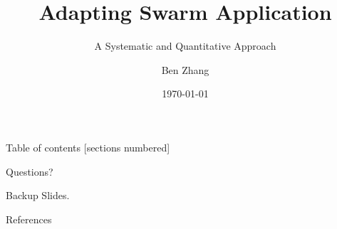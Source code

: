 \documentclass[10pt, handout]{beamer}
\title{Adapting Swarm Application}
\subtitle{A Systematic and Quantitative Approach}
\date{\today}
\author{Ben Zhang}
\begin{document}
\maketitle

\begin{frame}{Table of contents}
  [sections numbered]
  \tableofcontents[hideallsubsections]
\end{frame}


% 

% 
% 

\appendix

% 

\begin{frame}[standout]
  Questions?
\end{frame}

\begin{frame}[standout]
  Backup Slides.
\end{frame}



{
  \footnotesize
  \begin{frame}[allowframebreaks]{References}
    
    
  \end{frame}
}
\end{document}
